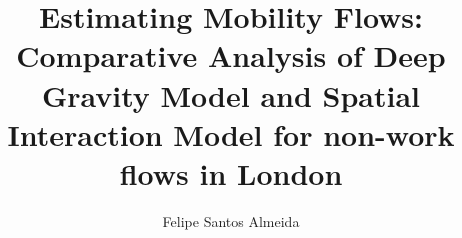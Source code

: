 
\title{Estimating Mobility Flows: Comparative Analysis of Deep Gravity Model and Spatial Interaction Model for non-work flows in London}
\author{Felipe Santos Almeida}

\maketitle
\makedeclaration


